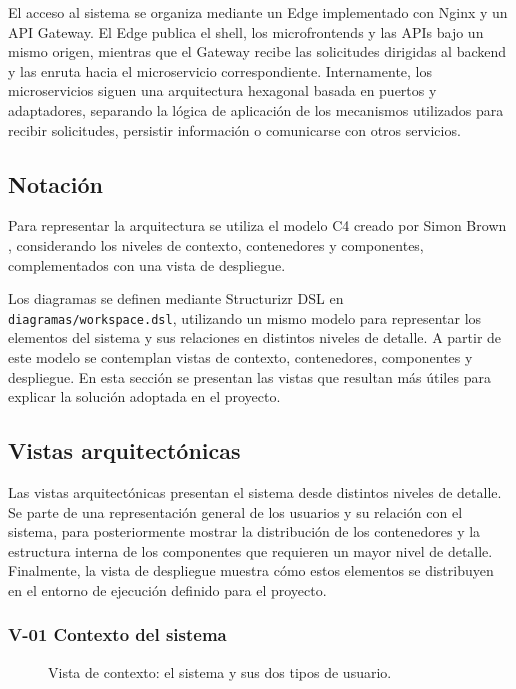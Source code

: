 El acceso al sistema se organiza mediante un Edge implementado con Nginx y un
API Gateway. El Edge publica el shell, los microfrontends y las APIs bajo un
mismo origen, mientras que el Gateway recibe las solicitudes dirigidas al backend
y las enruta hacia el microservicio correspondiente. Internamente, los
microservicios siguen una arquitectura hexagonal basada en puertos y adaptadores,
separando la lógica de aplicación de los mecanismos utilizados para recibir
solicitudes, persistir información o comunicarse con otros servicios.

\subsection{Notación}
\label{sec:notacion}

Para representar la arquitectura se utiliza el modelo C4 creado por Simon Brown
\cite{c4model},
considerando los niveles de contexto, contenedores y componentes, complementados
con una vista de despliegue.

Los diagramas se definen mediante Structurizr DSL en \texttt{diagramas/workspace.dsl}, 
utilizando un mismo modelo para representar los elementos del sistema y sus relaciones 
en distintos niveles de detalle. A partir de este modelo se contemplan vistas de contexto, 
contenedores, componentes y despliegue. En esta sección se presentan las vistas que 
resultan más útiles para explicar la solución adoptada en el proyecto.

\subsection{Vistas arquitectónicas}
\label{sec:vistas}

Las vistas arquitectónicas presentan el sistema desde distintos niveles de detalle.
Se parte de una representación general de los usuarios y su relación con el sistema,
para posteriormente mostrar la distribución de los contenedores y la estructura
interna de los componentes que requieren un mayor nivel de detalle. Finalmente,
la vista de despliegue muestra cómo estos elementos se distribuyen en el entorno
de ejecución definido para el proyecto.

\subsubsection{\texorpdfstring{\textsf{V-01}}{V-01} Contexto del sistema}
\label{v:01}

\begin{figure}[H]
  \centering
  \caption{Vista de contexto: el sistema y sus dos tipos de usuario.}
  \label{fig:contexto}
\end{figure}

